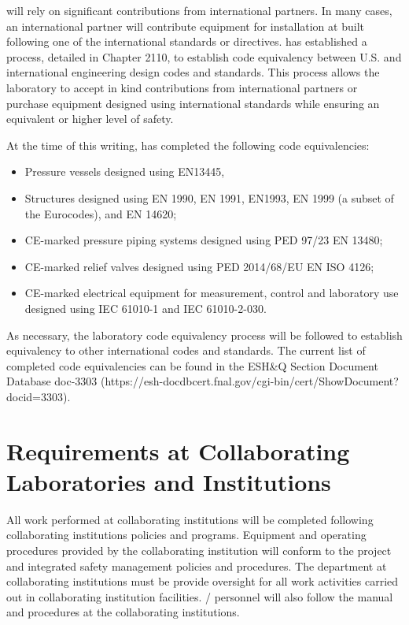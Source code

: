  will rely on significant contributions from international
partners. In many cases, an international partner will contribute
equipment for installation at \fnal built following one of the
international standards or directives. \fnal has established a
process, detailed in  Chapter 2110, to establish code equivalency
between U.S. and international engineering design codes and
standards. This process allows the laboratory to accept in kind
contributions from international partners or purchase equipment
designed using international standards while ensuring an equivalent or
higher level of safety.

At the time of this writing, \fnal has completed the following code
equivalencies:
\begin{itemize}
 \item Pressure vessels designed using EN13445,
 \item Structures designed using EN 1990, EN 1991, EN1993, EN 1999 (a
   subset of the Eurocodes), and EN 14620;
 \item CE-marked pressure piping systems designed using PED 97/23 EN 13480;
 \item CE-marked relief valves designed using PED 2014/68/EU EN ISO 4126;
 \item CE-marked electrical equipment for measurement, control and
   laboratory use designed using IEC 61010-1 and IEC 61010-2-030.
\end{itemize}

As necessary, the laboratory code equivalency process will be followed
to establish equivalency to other international codes and
standards. The current list of completed code equivalencies can be
found in the ESH\&Q Section Document Database doc-3303
(https://esh-docdbcert.fnal.gov/cgi-bin/cert/ShowDocument?docid=3303).

\section{ Requirements at Collaborating Laboratories and Institutions}

All work performed at collaborating institutions will be completed following collaborating institutions 
policies and programs. Equipment and operating procedures
provided by the collaborating institution will conform to the 
project  and integrated safety management policies and
procedures. The  department at collaborating institutions must be
provide  oversight for all work activities
carried out in collaborating institution facilities. /
personnel will also follow the  manual and procedures at the
collaborating institutions.
